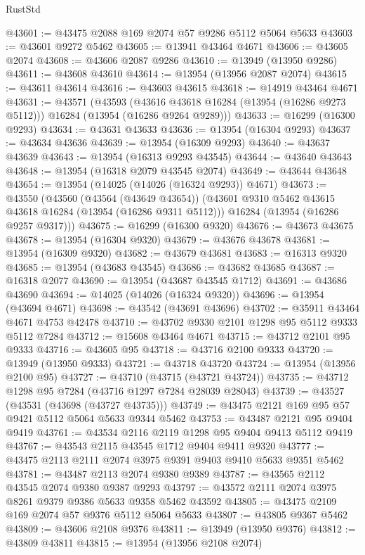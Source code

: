 \begin{lexlean}{RustStd}
\begin{coremodule}
@43601 := @43475 @2088 @169 @2074 @57 @9286 @5112 @5064 @5633
@43603 := @43601 @9272 @5462
@43605 := @13941 @43464 @4671
@43606 := @43605 @2074
@43608 := @43606 @2087 @9286
@43610 := @13949 (@13950 @9286)
@43611 := @43608 @43610
@43614 := @13954 (@13956 @2087 @2074)
@43615 := @43611 @43614
@43616 := @43603 @43615
@43618 := @14919 @43464 @4671
@43631 := @43571
    (@43593
      (@43616 @43618 @16284 (@13954 (@16286 @9273 @5112)))
      @16284
      (@13954 (@16286 @9264 @9289)))
@43633 := @16299 (@16300 @9293)
@43634 := @43631 @43633
@43636 := @13954 (@16304 @9293)
@43637 := @43634 @43636
@43639 := @13954 (@16309 @9293)
@43640 := @43637 @43639
@43643 := @13954 (@16313 @9293 @43545)
@43644 := @43640 @43643
@43648 := @13954 (@16318 @2079 @43545 @2074)
@43649 := @43644 @43648
@43654 := @13954 (@14025 (@14026 (@16324 @9293)) @4671)
@43673 := @43550
    (@43560
      (@43564 (@43649 @43654))
      (@43601 @9310 @5462 @43615 @43618 @16284 (@13954 (@16286 @9311 @5112)))
      @16284
      (@13954 (@16286 @9257 @9317)))
@43675 := @16299 (@16300 @9320)
@43676 := @43673 @43675
@43678 := @13954 (@16304 @9320)
@43679 := @43676 @43678
@43681 := @13954 (@16309 @9320)
@43682 := @43679 @43681
@43683 := @16313 @9320
@43685 := @13954 (@43683 @43545)
@43686 := @43682 @43685
@43687 := @16318 @2077
@43690 := @13954 (@43687 @43545 @1712)
@43691 := @43686 @43690
@43694 := @14025 (@14026 (@16324 @9320))
@43696 := @13954 (@43694 @4671)
@43698 := @43542 (@43691 @43696)
@43702 := @35911 @43464 @4671 @4753 @42478
@43710 := @43702 @9330 @2101 @1298 @95 @5112 @9333 @5112 @7284
@43712 := @15608 @43464 @4671
@43715 := @43712 @2101 @95 @9333
@43716 := @43605 @95
@43718 := @43716 @2100 @9333
@43720 := @13949 (@13950 @9333)
@43721 := @43718 @43720
@43724 := @13954 (@13956 @2100 @95)
@43727 := @43710 (@43715 (@43721 @43724))
@43735 := @43712 @1298 @95 @7284 (@43716 @1297 @7284 @28039 @28043)
@43739 := @43527 (@43531 (@43698 (@43727 @43735)))
@43749 := @43475 @2121 @169 @95 @57 @9421 @5112 @5064 @5633 @9344 @5462
@43753 := @43487 @2121 @95 @9404 @9419
@43761 := @43534 @2116 @2119 @1298 @95 @9404 @9413 @5112 @9419
@43767 := @43543 @2115 @43545 @1712 @9404 @9411 @9320
@43777 := @43475 @2113 @2111 @2074 @3975 @9391 @9403 @9410 @5633 @9351 @5462
@43781 := @43487 @2113 @2074 @9380 @9389
@43787 := @43565 @2112 @43545 @2074 @9380 @9387 @9293
@43797 := @43572 @2111 @2074 @3975 @8261 @9379 @9386 @5633 @9358 @5462 @43592
@43805 := @43475 @2109 @169 @2074 @57 @9376 @5112 @5064 @5633
@43807 := @43805 @9367 @5462
@43809 := @43606 @2108 @9376
@43811 := @13949 (@13950 @9376)
@43812 := @43809 @43811
@43815 := @13954 (@13956 @2108 @2074)

\end{coremodule}
\end{lexlean}
